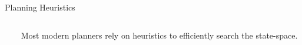 \documentclass[usenames,dvipsnames]{beamer}
\begin{document}
\begin{frame}[c]{Planning Heuristics}
	\begin{columns}[t]
		\begin{column}[t]{.45\textwidth}
			\begin{center}
			\end{center}
		\end{column}
		\begin{column}[t]{.55\textwidth}
			Most modern planners rely on heuristics to efficiently search the state-space.
			

\end{column}
\end{columns}
\end{frame}
\end{document}
